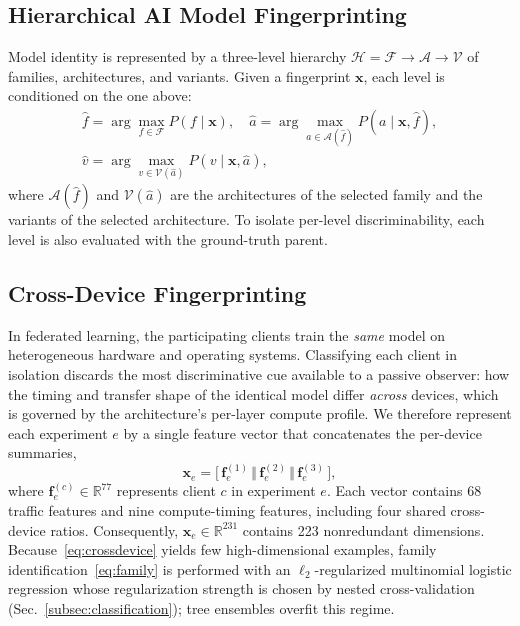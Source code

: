 \documentclass[conference]{IEEEtran}
\begin{document}
\subsection{Hierarchical AI Model Fingerprinting}
Model identity is represented by a three-level hierarchy
$\mathcal{H} = \mathcal{F} \rightarrow \mathcal{A} \rightarrow \mathcal{V}$ of
families, architectures, and variants. Given a fingerprint $\mathbf{x}$, each
level is conditioned on the one above:
\begin{equation}
\begin{gathered}
\hat{f} = \arg\max_{f \in \mathcal{F}} P(f \mid \mathbf{x}), \quad
\hat{a} = \arg\max_{a \in \mathcal{A}(\hat{f})} P(a \mid \mathbf{x},\hat{f}),\\
\hat{v} = \arg\max_{v \in \mathcal{V}(\hat{a})} P(v \mid \mathbf{x},\hat{a}),
\end{gathered}
\label{eq:family}
\end{equation}
where $\mathcal{A}(\hat{f})$ and $\mathcal{V}(\hat{a})$ are the architectures of
the selected family and the variants of the selected architecture. To isolate
per-level discriminability, each level is also evaluated with the ground-truth
parent.

\subsection{Cross-Device Fingerprinting}
\label{subsec:crossdevice}
In federated learning, the participating clients train the \emph{same} model on
heterogeneous hardware and operating systems. Classifying each client in isolation discards the most
discriminative cue available to a passive observer: how the timing and transfer
shape of the identical model differ \emph{across} devices, which is governed by
the architecture's per-layer compute profile. We therefore represent each
experiment $e$ by a single feature vector that concatenates the per-device
summaries,
\begin{equation}
\mathbf{x}_e =
\big[\,
\mathbf{f}^{(1)}_{e} \,\Vert\,
\mathbf{f}^{(2)}_{e} \,\Vert\,
\mathbf{f}^{(3)}_{e}
\,\big],
\label{eq:crossdevice}
\end{equation}
where $\mathbf{f}^{(c)}_e\in\mathbb{R}^{77}$ represents client $c$ in experiment
$e$. Each vector contains 68 traffic features and nine compute-timing features,
including four shared cross-device ratios. Consequently,
$\mathbf{x}_e\in\mathbb{R}^{231}$ contains 223 nonredundant dimensions.
Because~\eqref{eq:crossdevice} yields few high-dimensional examples, family
identification~\eqref{eq:family} is performed with an $\ell_2$-regularized
multinomial logistic regression whose regularization strength is chosen by
nested cross-validation (Sec.~\ref{subsec:classification}); tree ensembles
overfit this regime.
\end{document}
